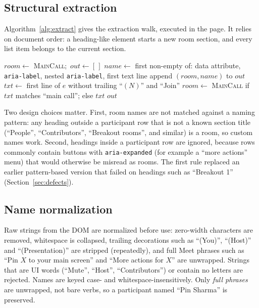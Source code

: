 \documentclass[conference]{IEEEtran}
\begin{document}
\subsection{Structural extraction}
Algorithm~\ref{alg:extract} gives the extraction walk, executed in the page. It relies on document order: a heading-like element starts a new room section, and every list item belongs to the current section.

\begin{algorithm}[t]
\caption{Room-aware extraction (runs in the page)}\label{alg:extract}
\begin{algorithmic}[1]
\STATE $room \leftarrow$ \textsc{MainCall};\ $out \leftarrow [\,]$
    \STATE $name \leftarrow$ first non-empty of: data attribute, \texttt{aria-label}, nested \texttt{aria-label}, first text line
    \STATE append $(room, name)$ to $out$
    \STATE $txt \leftarrow$ first line of $e$ without trailing ``$(N)$'' and ``Join''
      \STATE $room \leftarrow$ \textsc{MainCall} if $txt$ matches ``main call''; else $txt$
    \ENDIF
  \ENDIF
\ENDFOR
\RETURN $out$
\end{algorithmic}
\end{algorithm}

Two design choices matter. First, room names are not matched against a naming pattern: any heading outside a participant row that is not a known section title (``People'', ``Contributors'', ``Breakout rooms'', and similar) is a room, so custom names work. Second, headings inside a participant row are ignored, because rows commonly contain buttons with \texttt{aria-expanded} (for example a ``more actions'' menu) that would otherwise be misread as rooms. The first rule replaced an earlier pattern-based version that failed on headings such as ``Breakout 1'' (Section~\ref{sec:defects}).

\subsection{Name normalization}
Raw strings from the DOM are normalized before use: zero-width characters are removed, whitespace is collapsed, trailing decorations such as ``(You)'', ``(Host)'' and ``(Presentation)'' are stripped (repeatedly), and full Meet phrases such as ``Pin $X$ to your main screen'' and ``More actions for $X$'' are unwrapped. Strings that are UI words (``Mute'', ``Host'', ``Contributors'') or contain no letters are rejected. Names are keyed case- and whitespace-insensitively. Only \emph{full phrases} are unwrapped, not bare verbs, so a participant named ``Pin Sharma'' is preserved.
\end{document}
